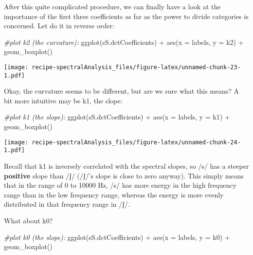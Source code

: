 \documentclass[
]{book}
\newenvironment{Shaded}{\begin{snugshade}}{\end{snugshade}}
\newcommand{\AttributeTok}[1]{\textcolor[rgb]{0.77,0.63,0.00}{#1}}
\newcommand{\CommentTok}[1]{\textcolor[rgb]{0.56,0.35,0.01}{\textit{#1}}}
\newcommand{\FunctionTok}[1]{\textcolor[rgb]{0.00,0.00,0.00}{#1}}
\newcommand{\NormalTok}[1]{#1}
\newcommand{\SpecialCharTok}[1]{\textcolor[rgb]{0.00,0.00,0.00}{#1}}
\begin{document}
After this quite complicated procedure, we can finally have a look at the importance of the first three coefficients as far as the power to divide categories is concerned. Let do it in reverse order:

\begin{Shaded}
\begin{Highlighting}[]
\CommentTok{\#plot k2 (the curvature):}
\FunctionTok{ggplot}\NormalTok{(sS.dctCoefficients) }\SpecialCharTok{+}
  \FunctionTok{aes}\NormalTok{(}\AttributeTok{x =}\NormalTok{ labels, }\AttributeTok{y =}\NormalTok{ k2) }\SpecialCharTok{+}
  \FunctionTok{geom\_boxplot}\NormalTok{()}
\end{Highlighting}
\end{Shaded}

\texttt{[image: recipe-spectralAnalysis\_files/figure-latex/unnamed-chunk-23-1.pdf]}

Okay, the curvature seems to be different, but are we sure what this means?
A bit more intuitive may be k1, the slope:

\begin{Shaded}
\begin{Highlighting}[]
\CommentTok{\#plot k1 (the slope):}
\FunctionTok{ggplot}\NormalTok{(sS.dctCoefficients) }\SpecialCharTok{+}
  \FunctionTok{aes}\NormalTok{(}\AttributeTok{x =}\NormalTok{ labels, }\AttributeTok{y =}\NormalTok{ k1) }\SpecialCharTok{+}
  \FunctionTok{geom\_boxplot}\NormalTok{()}
\end{Highlighting}
\end{Shaded}

\texttt{[image: recipe-spectralAnalysis\_files/figure-latex/unnamed-chunk-24-1.pdf]}

Recall that k1 is inversely correlated with the spectral slopes, so /s/ has a steeper \textbf{positive} slope than /ʃ/ (/ʃ/'s slope is close to zero anyway).
This simply means that in the range of 0 to 10000 Hz, /s/ has more energy in the high frequency range than in the low frequency range, whereas the energy is more evenly distributed in that frequency range in /ʃ/.

What about k0?

\begin{Shaded}
\begin{Highlighting}[]
\CommentTok{\#plot k0 (the slope):}
\FunctionTok{ggplot}\NormalTok{(sS.dctCoefficients) }\SpecialCharTok{+}
  \FunctionTok{aes}\NormalTok{(}\AttributeTok{x =}\NormalTok{ labels, }\AttributeTok{y =}\NormalTok{ k0) }\SpecialCharTok{+}
  \FunctionTok{geom\_boxplot}\NormalTok{()}
\end{Highlighting}
\end{Shaded}
\end{document}
